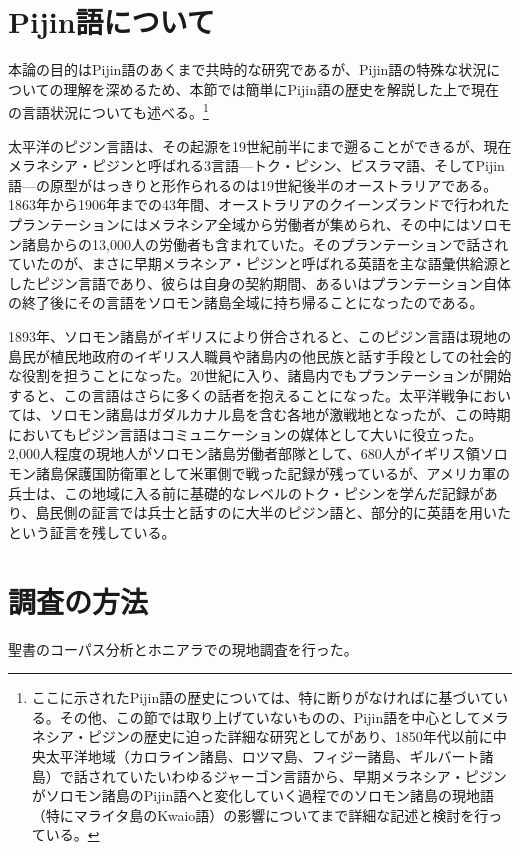 \section{Pijin語について}

本論の目的はPijin語のあくまで共時的な研究であるが、Pijin語の特殊な状況についての理解を深めるため、本節では簡単にPijin語の歴史を解説した上で現在の言語状況についても述べる。\footnote{
ここに示されたPijin語の歴史については、特に断りがなければ\cite{phonology}に基づいている。その他、この節では取り上げていないものの、Pijin語を中心としてメラネシア・ピジンの歴史に迫った詳細な研究として\cite{keesing}があり、1850年代以前に中央太平洋地域（カロライン諸島、ロツマ島、フィジー諸島、ギルバート諸島）で話されていたいわゆるジャーゴン言語から、早期メラネシア・ピジンがソロモン諸島のPijin語へと変化していく過程でのソロモン諸島の現地語（特にマライタ島のKwaio語）の影響についてまで詳細な記述と検討を行っている。}

太平洋のピジン言語は、その起源を19世紀前半にまで遡ることができる\cite{keesing}が、現在メラネシア・ピジンと呼ばれる3言語---トク・ピシン、ビスラマ語、そしてPijin語---の原型がはっきりと形作られるのは19世紀後半のオーストラリアである。1863年から1906年までの43年間、オーストラリアのクイーンズランドで行われたプランテーションにはメラネシア全域から労働者が集められ、その中にはソロモン諸島からの13,000人の労働者も含まれていた。そのプランテーションで話されていたのが、まさに早期メラネシア・ピジンと呼ばれる英語を主な語彙供給源としたピジン言語であり、彼らは自身の契約期間、あるいはプランテーション自体の終了後にその言語をソロモン諸島全域に持ち帰ることになったのである。

1893年、ソロモン諸島がイギリスにより併合されると、このピジン言語は現地の島民が植民地政府のイギリス人職員や諸島内の他民族と話す手段としての社会的な役割を担うことになった。20世紀に入り、諸島内でもプランテーションが開始すると、この言語はさらに多くの話者を抱えることになった。太平洋戦争においては、ソロモン諸島はガダルカナル島を含む各地が激戦地となったが、この時期においてもピジン言語はコミュニケーションの媒体として大いに役立った。2,000人程度の現地人がソロモン諸島労働者部隊として、680人がイギリス領ソロモン諸島保護国防衛軍として米軍側で戦った記録が残っているが、アメリカ軍の兵士は、この地域に入る前に基礎的なレベルのトク・ピシンを学んだ記録があり、島民側の証言では兵士と話すのに大半のピジン語と、部分的に英語を用いたという証言を残している。

\section{調査の方法}

聖書のコーパス分析とホニアラでの現地調査を行った。
